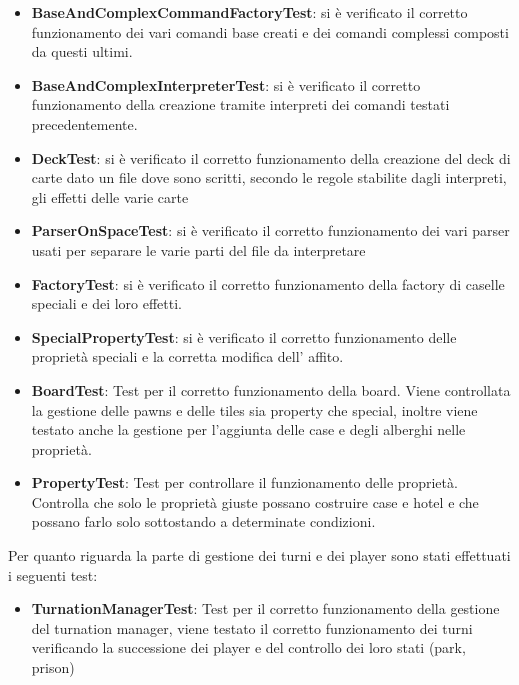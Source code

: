\begin{itemize}
    \item \textbf{BaseAndComplexCommandFactoryTest}: si è verificato il corretto funzionamento dei vari comandi base creati e dei comandi complessi composti da questi ultimi.
    \item \textbf{BaseAndComplexInterpreterTest}: si è verificato il corretto funzionamento della creazione tramite interpreti dei comandi testati precedentemente.
    \item \textbf{DeckTest}: si è verificato il corretto funzionamento della creazione del deck di carte dato un file dove sono scritti, secondo le regole stabilite dagli interpreti, gli effetti delle varie carte
    \item \textbf{ParserOnSpaceTest}: si è verificato il corretto funzionamento dei vari parser usati per separare le varie parti del file da interpretare
    \item \textbf{FactoryTest}: si è verificato il corretto funzionamento della factory di caselle speciali e dei loro effetti. 
    \item \textbf{SpecialPropertyTest}: si è verificato il corretto funzionamento delle proprietà speciali e la corretta modifica dell' affito.
    \item \textbf{BoardTest}: Test per il corretto funzionamento della board. Viene controllata la gestione delle pawns e delle tiles sia property che special, inoltre viene testato anche la gestione per l'aggiunta delle case e degli alberghi nelle proprietà.
    \item \textbf{PropertyTest}: Test per controllare il funzionamento delle proprietà. Controlla che solo le proprietà giuste possano costruire case e hotel e che possano farlo solo sottostando a determinate condizioni.
\end{itemize}
Per quanto riguarda la parte di gestione dei turni e dei player sono stati effettuati i seguenti test:\newline
\begin{itemize}
    \item \textbf{TurnationManagerTest}: Test per il corretto funzionamento della gestione del turnation manager, viene testato il corretto funzionamento dei turni verificando la successione dei player e del controllo dei loro stati (park, prison)
\end{itemize}
